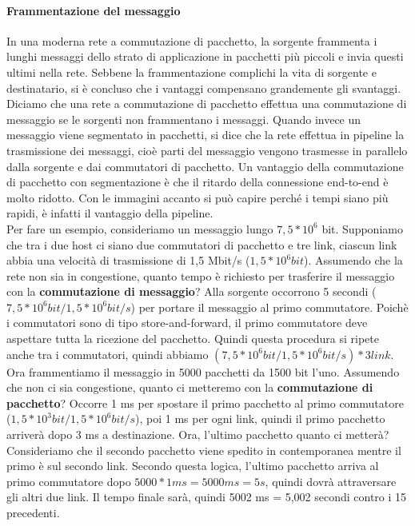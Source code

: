 \documentclass[11pt,a4paper]{book}
\begin{document}
\paragraph{Frammentazione del messaggio}
In una moderna rete a commutazione di pacchetto, la sorgente frammenta i lunghi messaggi dello strato di applicazione in pacchetti più piccoli e invia questi ultimi nella rete. Sebbene la frammentazione complichi la vita di sorgente e destinatario, si è concluso che i vantaggi compensano grandemente gli svantaggi.
Diciamo che una rete a commutazione di pacchetto effettua una commutazione di messaggio se le sorgenti non frammentano i messaggi.
Quando invece un messaggio viene segmentato in pacchetti, si dice che la rete effettua in pipeline la trasmissione dei messaggi, cioè parti del messaggio vengono trasmesse in parallelo dalla sorgente e dai commutatori di pacchetto.
Un vantaggio della commutazione di pacchetto con segmentazione è che il ritardo della connessione end-to-end è molto ridotto. Con le immagini accanto si può capire perché i tempi siano più rapidi, è infatti il vantaggio della pipeline. \\
Per fare un esempio, consideriamo un messaggio lungo $7,5 * 10^{6}$ bit. Supponiamo che tra i due host ci siano due commutatori di pacchetto e tre link, ciascun link abbia una velocità di trasmissione di 1,5 Mbit/s ($1,5 * 10^{6} bit$). Assumendo che la rete non sia in congestione, quanto tempo è richiesto per trasferire il messaggio con la \textbf{commutazione di messaggio}? Alla sorgente occorrono 5 secondi ($7,5 * 10^{6} bit / 1,5 * 10^{6} bit/s$) per portare il messaggio al primo commutatore. Poichè i commutatori sono di tipo store-and-forward, il primo commutatore deve aspettare tutta la ricezione del pacchetto. Quindi questa procedura si ripete anche tra i commutatori, quindi abbiamo $(7,5 * 10^{6} bit / 1,5 * 10^{6} bit/s)*3 link$. \\
Ora frammentiamo il messaggio in 5000 pacchetti da 1500 bit l'uno. Assumendo che non ci sia congestione, quanto ci metteremo con la \textbf{commutazione di pacchetto}? Occorre 1 ms per spostare il primo pacchetto al primo commutatore ($1,5 * 10^{3} bit / 1,5 * 10^{6} bit/s$), poi 1 ms per ogni link, quindi il primo pacchetto arriverà dopo 3 ms a destinazione. Ora, l'ultimo pacchetto quanto ci metterà? Consideriamo che il secondo pacchetto viene spedito in contemporanea mentre il primo è sul secondo link. Secondo questa logica, l'ultimo pacchetto arriva al primo commutatore dopo $5000 * 1 ms = 5000 ms = 5 s$, quindi dovrà attraversare gli altri due link. Il tempo finale sarà, quindi 5002 ms = 5,002 secondi contro i 15 precedenti. \\
\end{document}
